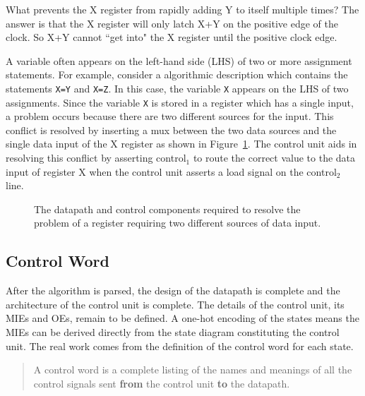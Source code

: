 \begin{description}
        What prevents the X register from rapidly adding Y to itself
        multiple times?  The answer is that the X register will
        only latch X+Y on the positive edge of the clock.  So
        X+Y cannot ``get into" the X register until the positive
        clock edge.

        A variable often appears on the left-hand side (LHS)
        of two or more assignment statements.  For example, consider a
        algorithmic description which contains the statements \verb+X=Y+
        and \verb+X=Z+.  In this case, the variable \verb^X^ appears on the LHS
        of two assignments.  Since the variable \verb^X^ is stored in a register
        which has a single input, a problem occurs because there are two
        different sources for the input.  This conflict is resolved by
        inserting a mux between the two data sources and the single
        data input of the X register as shown in Figure~\ref{fig:datapathControl2Source}.
        The control unit aids in resolving this conflict by asserting
        control$_1$ to route the correct value to the data input of
        register X when the control unit asserts a load signal on the
        control$_2$ line.

        \begin{figure}[ht]
            \caption{The datapath and control components required to resolve
                the problem of a register requiring two different sources of
            data input.}
            \label{fig:datapathControl2Source}
        \end{figure}

\end{description}


\subsection{Control Word}
After the algorithm is parsed, the design of the datapath is complete
and the architecture of the control unit is complete.  The details of
the control unit, its MIEs and OEs, remain to be defined.  A
one-hot encoding of the states means the MIEs can be derived directly
from the state diagram constituting the control unit.  The real work
comes from the definition of the control word for each state.

\begin{quote}
    A control word is a complete listing of the names and meanings of
    all the control signals sent \textbf{ from} the control unit \textbf{ to} the
    datapath.
\end{quote}

